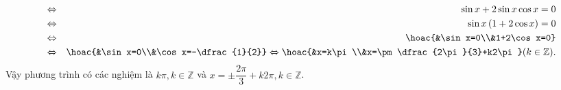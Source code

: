 \begin{bt}
{\begin{listEX}
\begin{eqnarray*}
				&\Leftrightarrow& \sin x+2\sin x\cos x=0 \\
				&\Leftrightarrow& \sin x \left(1+2\cos x\right)=0 \\
				&\Leftrightarrow& \hoac{&\sin x=0\\&1+2\cos x=0} \\
				&\Leftrightarrow& \hoac{&\sin x=0\\&\cos x=-\dfrac{1}{2}}\Leftrightarrow \hoac{&x=k\pi\\&x=\pm \dfrac{2\pi}{3}+k2\pi} (k\in\mathbb{Z}).
			\end{eqnarray*}	
			Vậy phương trình có các nghiệm là $k\pi, k\in\mathbb{Z}$ và $x=\pm \dfrac{2\pi}{3}+k2\pi, k\in\mathbb{Z}$.
		\end{listEX}
	}
\end{bt}

